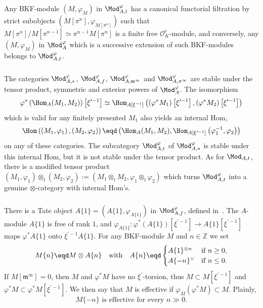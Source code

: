 \subsubsection{}

Any BKF-module $(M,\varphi_{M})$ in $\Mod_{A,t}^{\varphi}$ has a canonical functorial filtration by strict subobjects $(M[\pi^{n}],\varphi_{M[\pi^{n}]})$ such that $M[\pi^{n}]/M[\pi^{n-1}]\simeq\pi^{n-1}M[\pi^{n}]$ is a finite free $\mathcal{O}_{K}^{\flat}$-module, and conversely, any $(M,\varphi_{M})$ in $\Mod_{A}^{\varphi}$ which is a successive extension of such BKF-modules belongs to $\Mod_{A,t}^{\varphi}$.

\subsubsection{}

The categories $\Mod_{A,\ast}^{\varphi}$, $\Mod_{A,f}^{\varphi}$, $\Mod_{A,\mathfrak{m}^{\infty}}^{\varphi}$ and $\Mod_{A,\pi^{\infty}}^{\varphi}$ are stable under the tensor product, symmetric and exterior powers of $\Mod_{A}^{\varphi}$. The isomorphism
\[
\varphi^{\ast}\left(\Hom_{A}(M_{1},M_{2})\right)\left[\xi^{\prime-1}\right]\simeq\Hom_{A[\xi^{-1}]}\left(\left(\varphi^{\ast}M_{1}\right)\left[\xi^{\prime-1}\right],\left(\varphi^{\ast}M_{2}\right)\left[\xi^{\prime-1}\right]\right)
\]
which is valid for any finitely presented $M_{1}$ also yields an internal Hom,
\[
\Hom\left(\left(M_{1},\varphi_{1}\right),\left(M_{2},\varphi_{2}\right)\right)\eqd\left(\Hom_{A}(M_{1},M_{2}),\Hom_{A[\xi^{\prime-1}]}\left(\varphi_{1}^{-1},\varphi_{2}\right)\right)
\]
on any of these categories. The subcategory $\Mod_{A,t}^{\varphi}$ of $\Mod_{A,\ast}^{\varphi}$ is stable under this internal Hom, but it is not stable under the tensor product. As for $\Mod_{A,t}$, there is a modified tensor product $(M_{1},\varphi_{1})\otimes_{t}(M_{2},\varphi_{2}):=(M_{1}\otimes_{t}M_{2},\varphi_{1}\otimes_{t}\varphi_{2})$ which turns $\Mod_{A,t}^{\varphi}$ into a genuine $\otimes$-category with internal Hom's.

\subsubsection{}

There is a Tate object $A\{1\}=\left(A\{1\},\varphi_{A\{1\}}\right)$ in $\Mod_{A,f}^{\varphi}$, defined in~\cite[4.24]{BaMoSc16}. The $A$-module $A\{1\}$ is free of rank $1$, and $\varphi_{A\{1\}}:\varphi^{\ast}(A\{1\})[\xi^{\prime-1}]\rightarrow A\{1\}[\xi^{\prime-1}]$ maps $\varphi^{\ast}A\{1\}$ onto $\xi^{\prime-1}A\{1\}$. For any BKF-module $M$ and $n\in\mathbb{Z}$ we set
\[
M\{n\}\eqd M\otimes A\{n\}\quad\text{with}\quad A\{n\}\eqd
\begin{cases}
A\{1\}^{\otimes n} & \text{if }n\geq0,\\
A\{-n\}^{\vee} & \text{if }n\leq0.
\end{cases}
\]
If $M[\mathfrak{m}^{\infty}]=0$, then $M$ and $\varphi^{\ast}M$ have no $\xi^{\prime}$-torsion, thus $M\subset M[\xi^{\prime-1}]$ and $\varphi^{\ast}M\subset\varphi^{\ast}M[\xi^{\prime-1}]$. We then say that $M$ is effective if $\varphi_{M}(\varphi^{\ast}M)\subset M$. Plainly,
\[
M\{-n\}\text{ is effective for every }n\gg0.
\]



